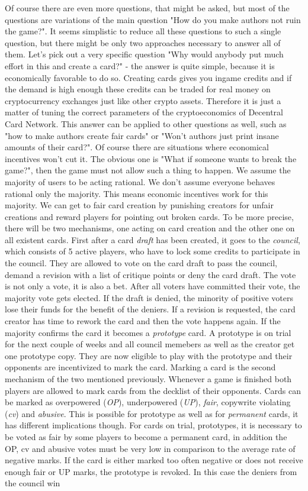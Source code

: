 \documentclass{article}
\begin{document}
%
Of course there are even more questions, that might be asked, but most of the questions are variations of the main question "How do you make authors not ruin the game?". It seems simplistic to reduce all these questions to such a single question, but there might be only two approaches necessary to answer all of them. Let's pick out a very specific question "Why would anybody put much effort in this and create a card?" - the answer is quite simple, because it is economically favorable to do so. Creating cards gives you ingame credits and if the demand is high enough these credits can be traded for real money on cryptocurrency exchanges just like other crypto assets. Therefore it is just a matter of tuning the correct parameters of the cryptoeconomics of Decentral Card Network. This answer can be applied to other questions as well, such as "how to make authors create fair cards" or "Won't authors just print insane amounts of their card?". Of course there are situations where economical incentives won't cut it. The obvious one is "What if someone wants to break the game?", then the game must not allow such a thing to happen. We assume the majority of users to be acting rational. We don't assume everyone behaves rational only the majority. This means economic incentives work for this majority. We can get to fair card creation by punishing creators for unfair creations and reward players for pointing out broken cards. To be more precise, there will be two mechanisms, one acting on card creation and the other one on all existent cards. First after a card \textit{draft} has been created, it goes to the \textit{council}, which consists of 5 active players, who have to lock some credits to participate in the council. They are allowed to vote on the card draft to pass the council, demand a revision with a list of critique points or deny the card draft. The vote is not only a vote, it is also a bet. After all voters have committed their vote, the majority vote gets elected. If the draft is denied, the minority of positive voters lose their funds for the benefit of the deniers. If a revision is requested, the card creator has time to rework the card and then the vote happens again. If the majority confirms the card it becomes a \textit{prototype} card. A prototype is on trial for the next couple of weeks and all council memebers as well as the creator get one prototype copy. They are now eligible to play with the prototype and their opponents are incentivized to mark the card. Marking a card is the second mechanism of the two mentioned previously. Whenever a game is finished both players are allowed to mark cards from the decklist of their opponents. Cards can be marked as overpowered (\textit{OP}), underpowered (\textit{UP}), \textit{fair}, copywrite violating (\textit{cv}) and \textit{abusive}. This is possible for prototype as well as for \textit{permanent} cards, it has different implications though. For cards on trial, prototypes, it is necessary to be voted as fair by some players to become a permanent card, in addition the OP, cv and abusive votes must be very low in comparison to the average rate of negative marks. If the card is either marked too often negative or does not receive enough fair or UP marks, the prototype is revoked. In this case the deniers from the council win 
\end{document}
